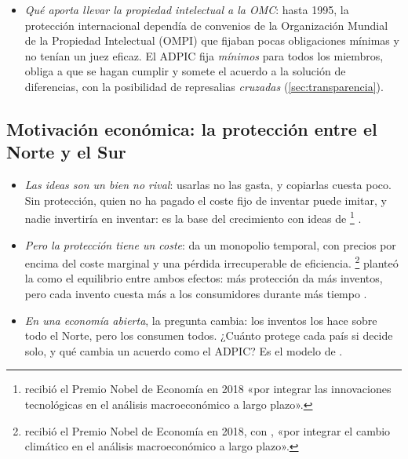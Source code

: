 \documentclass[11pt]{article}
\begin{document}
\begin{itemize}
\item \emph{Qué aporta llevar la propiedad intelectual a la OMC}: hasta 1995, la protección internacional dependía de convenios de la Organización Mundial de la Propiedad Intelectual (OMPI) que fijaban pocas obligaciones mínimas y no tenían un juez eficaz. El ADPIC fija \emph{mínimos} para todos los miembros, obliga a que se hagan cumplir y somete el acuerdo a la solución de diferencias, con la posibilidad de represalias \emph{cruzadas} (\ref{sec:transparencia}).
\end{itemize}

\subsection{Motivación económica:\cortetitulo{} la protección entre el Norte y el Sur}\label{sec:pi-teoria}

\begin{itemize}
\item \emph{Las ideas son un bien no rival}: usarlas no las gasta, y copiarlas cuesta poco. Sin protección, quien no ha pagado el coste fijo de inventar puede imitar, y nadie invertiría en inventar: es la base del crecimiento con ideas de \textcite{Romer1990Endogenous}\footnote{ recibió el Premio Nobel de Economía en 2018 «por integrar las innovaciones tecnológicas en el análisis macroeconómico a largo plazo»\nocite{Nobel2018Romer}.} .
\item \emph{Pero la protección tiene un coste}: da un monopolio temporal, con precios por encima del coste marginal y una pérdida irrecuperable de eficiencia. \textcite{Nordhaus1969Invention}\footnote{ recibió el Premio Nobel de Economía en 2018, con , «por integrar el cambio climático en el análisis macroeconómico a largo plazo»\nocite{Nobel2018Nordhaus}.} planteó la  como el equilibrio entre ambos efectos: más protección da más inventos, pero cada invento cuesta más a los consumidores durante más tiempo .
\item \emph{En una economía abierta}, la pregunta cambia: los inventos los hace sobre todo el Norte, pero los consumen todos. ¿Cuánto protege cada país si decide solo, y qué cambia un acuerdo como el ADPIC? Es el modelo de \textcite{GrossmanLai2004International}.
\end{itemize}
\end{document}
